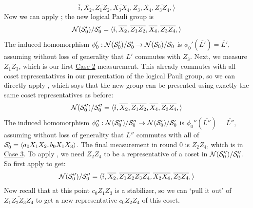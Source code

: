 \begin{example}
\begin{equation}
            \overline{i},
            \overline{X_2}, \overline{Z_1 Z_2},
            \overline{X_3 X_4}, \overline{Z_3},
            \overline{X_4}, \overline{Z_3 Z_4},
        \rangle
    \end{equation}
    Now we can apply ; the new logical Pauli group is
    \begin{equation}
        \mathcal{N}(\mathcal{S}_{0}')/\mathcal{S}_{0}' = \langle
            \overline{i},
            \overline{X_2}, \overline{Z_1 Z_2},
            \overline{X_4}, \overline{Z_3 Z_4},
        \rangle
    \end{equation}
    The induced homomorphism $\phi_0': \mathcal{N}(\mathcal{S}_{0}')/\mathcal{S}_{0}' \to \mathcal{N}(\mathcal{S}_{0})/\mathcal{S}_{0}$ is $\phi_0'(\overline{L'}) = \overline{L'}$, assuming without loss of generality that $L'$ commutes with $Z_3$.
    Next, we measure $Z_1 Z_3$, which is our first \hyperref[thm:stabilizer_group_update_measurement:case2]{Case 2} measurement.
    This already commutes with all coset representatives in our presentation of the logical Pauli group, so we can directly apply , which says that the new group can be presented using exactly the same coset representatives as before:
    \begin{equation}
        \mathcal{N}(\mathcal{S}_{0}'')/\mathcal{S}_{0}'' = \langle
        \overline{i},
        \overline{X_2}, \overline{Z_1 Z_2},
        \overline{X_4}, \overline{Z_3 Z_4},
        \rangle
    \end{equation}
    The induced homomorphism $\phi_0'': \mathcal{N}(\mathcal{S}_{0}'')/\mathcal{S}_{0}'' \to \mathcal{N}(\mathcal{S}_{0}')/\mathcal{S}_{0}'$ is $\phi_0''(\overline{L''}) = \overline{L''}$, assuming without loss of generality that $L''$ commutes with all of $\mathcal{S}_{0}' = \langle a_0 X_1 X_2, b_0 X_1 X_3 \rangle$.
    The final measurement in round $0$ is $Z_2 Z_4$, which is in \hyperref[thm:stabilizer_group_update_measurement:case3]{Case 3}.
    To apply , we need $Z_2 Z_4$ to be a representative of a coset in $\mathcal{N}(\mathcal{S}_{0}'')/\mathcal{S}_{0}''$.
    So first apply  to get:
    \begin{equation}
        \mathcal{N}(\mathcal{S}_{0}'')/\mathcal{S}_{0}'' = \langle
        \overline{i},
        \overline{X_2}, \overline{Z_1 Z_2 Z_3 Z_4},
        \overline{X_2 X_4}, \overline{Z_3 Z_4},
        \rangle
    \end{equation}
    Now recall that at this point $c_0 Z_1 Z_3$ is a stabilizer, so we can `pull it out' of $\overline{Z_1 Z_2 Z_3 Z_4}$ to get a new representative $c_0 Z_2 Z_4$ of this coset.

\end{example}
